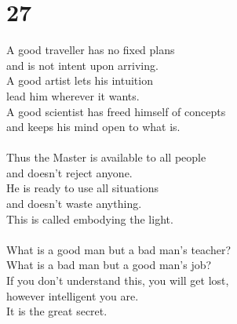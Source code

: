 \documentclass[b5paper, 12pt, oneside]{book}
\begin{document}
\chapter*{27}
A good traveller has no fixed plans\\
and is not intent upon arriving.\\
A good artist lets his intuition\\
lead him wherever it wants.\\
A good scientist has freed himself of concepts\\
and keeps his mind open to what is.\\
\\
Thus the Master is available to all people\\
and doesn't reject anyone.\\
He is ready to use all situations\\
and doesn't waste anything.\\
This is called embodying the light.\\
\\
What is a good man but a bad man's teacher?\\
What is a bad man but a good man's job?\\
If you don't understand this, you will get lost,\\
however intelligent you are.\\
It is the great secret.\\
\end{document}
